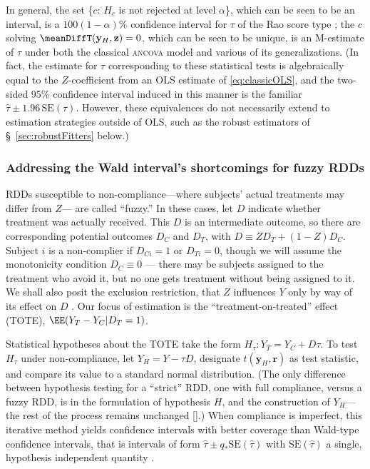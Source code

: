 In general, the set \{$c$:
$H_{c}$ is not rejected at level $\alpha$\}, which can be seen to be an interval, is a
$100(1-\alpha)\%$ confidence interval for $\tau$ of the Rao score type
\citep{agresti2011scoreintervals}; the $c$ solving
$\meanDiffT(\mathbf{y}_{H}, \mathbf{z}) = 0$, which can be seen to
be unique, is an M-estimate of $\tau$ under both the classical
\textsc{ancova} model and various of its generalizations.
(In fact, the estimate for $\tau$ corresponding to these statistical tests is
algebraically equal to the $Z$-coefficient from an OLS estimate of
\eqref{eq:classicOLS}, and the two-sided 95\% confidence interval induced in this
manner is the familiar
$\hat{\tau} \pm 1.96\, \mathrm{SE}(\tau)$.
However, these equivalences do not necessarily extend to estimation
strategies outside of OLS, such as the robust estimators of
\S~\ref{sec:robustFitters} below.)

\subsubsection{Addressing the Wald interval's shortcomings for fuzzy RDDs} \label{sec:fuzzy-regr-disc}
RDDs susceptible to non-compliance---where subjects' actual
treatments may differ from $Z$--- are called ``fuzzy.''
In these cases, let $D$ indicate whether treatment was actually
received.
This $D$ is an intermediate outcome, so there are
corresponding potential outcomes $D_{C}$ and $D_{T}$, with $D \equiv ZD_{T}
+ (1-Z)D_{C}$.
Subject $i$ is a non-complier if $D_{Ci}=1$ or $D_{Ti}=0$, though we
will assume the monotonicity condition $D_{C}\equiv 0$ --- there may be
subjects assigned to the treatment who avoid it, but no one gets
treatment without being assigned to it.
We shall also posit the exclusion restriction,
that $Z$ influences $Y$ only by way of its effect on $D$
\citep{bloom1984ans,Angrist:etal:1996,imbens:rose:2005}.
Our focus of estimation is the
 ``treatment-on-treated'' effect (TOTE),
$\EE(Y_{T} - Y_{C}| D_{T}=1)$.

Statistical hypotheses about the TOTE take the form
$H_\tau:Y_T=Y_C+D\tau$.
To test $H_\tau$ under non-compliance, let $Y_H=Y-\tau D$,
designate $t (\mathbf{y}_H,\mathbf{r})$ as test statistic, and compare
its value to a standard normal distribution.
(The only difference between hypothesis testing for a ``strict'' RDD, one
with full compliance, versus a fuzzy RDD, is in the formulation of
hypothesis $H$, and the construction of $Y_H$---the rest of the
process remains unchanged [\citealp{rosenbaum:1996:onAIR}].)  When
compliance is imperfect, this
iterative method yields confidence intervals with better coverage than Wald-type
confidence intervals, that is intervals of form $\hat\tau \pm q_{*}
\mathrm{SE}(\hat\tau)$ with $\mathrm{SE}(\hat\tau)$ a single,
hypothesis independent quantity
\citep[Sec.~7]{imbens:rose:2005,baiocchiChengSmall2014IVtutorial}.


